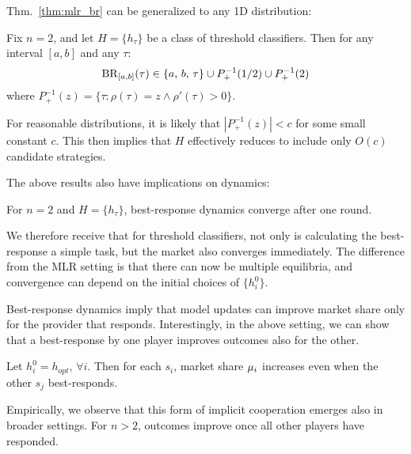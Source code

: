 


Thm.~\ref{thm:mlr_br} can be generalized to any 1D distribution:
\begin{theorem}
\label{thm:generalized_br_1d}
Fix $n=2$, and let $H = \{h_\tau\}$ be a class of threshold classifiers.
Then for any interval $[a,b]$ and any $\tau$:
\[
\mathrm{BR}_{[a,b]}(\tau) \in \{ a,\,b, \, \tau \} \cup  P_+^{-1}(1/2) \cup P_+^{-1}(2)
\]
where $P_+^{-1}(z) = \{\tau: \rho(\tau) = z \land \rho'(\tau) >0 \}$.
\end{theorem}
For reasonable distributions, 
it is likely that $| P_+^{-1}(z)| < c$ for some small constant $c$.
This then implies that $H$ effectively reduces to include only
$O(c)$ candidate strategies.

The above results
also have implications on dynamics:
\begin{proposition}
\label{prop:gen-br-1rd}
For $n=2$ and $H = \{h_\tau\}$,
best-response dynamics converge after one round.
\end{proposition}
We therefore receive that for threshold classifiers, not only is calculating the best-response a simple task, but the market also converges immediately.
The difference from the MLR setting is that
there can now be multiple equilibria,
and convergence can depend on the initial choices of $\{h_i^0\}$.

Best-response dynamics imply that model updates can  improve market share only for the provider that responds.
Interestingly, in the above setting, we can show that a best-response by one player improves outcomes also for the other.
\squeeze
\begin{proposition} %
\label{prop:i-improve-you-improve}
Let $h_i^0 = h_{opt}, \, \forall i$.
Then for each $s_i$, market share $\mu_i$ increases even when the other $s_j$ best-responds.
\end{proposition}
Empirically, we observe that this form of implicit cooperation emerges
also in broader settings.
For $n>2$, outcomes improve once all other players have responded.





